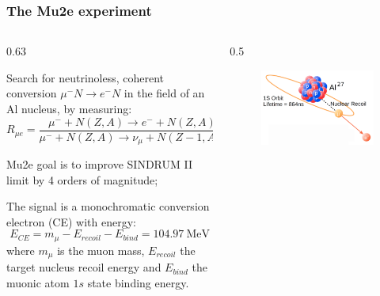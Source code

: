 \documentclass{beamer}
\begin{document}
\begin{frame}
    \frametitle{The Mu2e experiment}
    \vspace{-3mm}
\begin{columns}
    \begin{column}{0.63\framewidth}
        \setlength{\leftmargini}{1.3em}
        \begin{itemize}
          {\footnotesize  \item Search for neutrinoless, coherent conversion $\mu^- N \rightarrow e^- N$ in the field of an Al nucleus, by measuring: 
           \vspace{2mm}
            $$R_{\mu e}=\frac{\mu^{-}+N(Z, A) \rightarrow e^{-}+N(Z, A)}{\mu^{-}+N(Z, A) \rightarrow \nu_\mu+N(Z-1, A)}$$
            \vspace{2mm}
            \item Mu2e goal is to improve SINDRUM II limit by 4 orders of magnitude;
            \vspace{4mm}
            \item The signal is a monochromatic conversion electron (CE) with energy: 
            $$ E_{CE} = m_\mu - E_{recoil} - E_{bind} = 104.97 \ \text{MeV}$$
            where $m_\mu$ is the muon mass, $E_{recoil}$ the target nucleus recoil energy and $E_{bind}$ the muonic atom $1s$ state binding energy.}
        \end{itemize}
    \end{column}
    \begin{column}{0.5\framewidth}
    
                \begin{figure}[h]
            \centering
            \includegraphics[width=0.75\columnwidth]{figures/png/Screenshot_20240913_160115.png}
        \end{figure} 
    \end{column}
\end{columns}
\end{frame}
\end{document}

